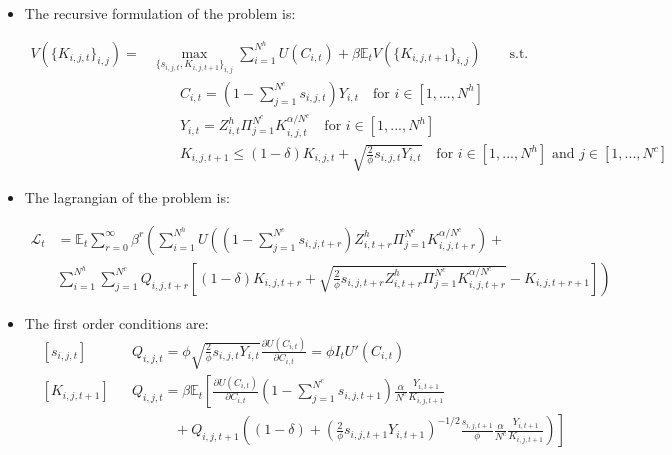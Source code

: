 \documentclass[11pt,english]{article}
\newcommand{\E}{\mathbb{E}}
\begin{document}
\begin{itemize}
	
	\item The recursive formulation of the problem is:
	
	
	\begin{align*}
	V\left(\{K_{i,j,t}\}_{i,j}\right) = &\max_{\{s_{i,j,t},K_{i,j,t+1}\}_{i,j}} \sum_{i=1}^{N^h} U(C_{i,t}) + \beta \E_t V(\{K_{i,j,t+1}\}_{i,j}) \qquad \text{s.t.}\\
	&\qquad
	C_{i,t} = (1-\sum_{j=1}^{N^c} s_{i,j,t})Y_{i,t} \quad \text{for } i \in [1,...,N^h]\\
	&\qquad
	Y_{i,t}=Z^h_{i,t} \Pi_{j=1}^{N^c} K_{i,j,t}^{\alpha/N^c}  \quad \text{for } i \in [1,...,N^h]\\
	&\qquad
	K_{i,j,t+1} \leq (1-\delta) K_{i,j,t} + \sqrt{\frac{2}{\phi} s_{i,j,t} Y_{i,t}}  \quad \text{for } i \in [1,...,N^h] \text{ and } j \in [1,...,N^c]
	\end{align*}
	
	
	\item The lagrangian of the problem is: 
	
	\begin{align*}
	\mathcal{L}_{t} &= \E_t \sum_{r=0}^{\infty}\beta^r  \left( \sum_{i=1}^{N^h} U\left( (1-\sum_{j=1}^{N^c} s_{i,j,t+r})Z^h_{i,t+r} \Pi_{j=1}^{N^c} K_{i,j,t+r}^{\alpha/N^c}  \right) + \right. \\
	& 	\left. \sum_{i=1}^{N^h} \sum_{j=1}^{N^c}  Q_{i,j,t+r} \left[(1-\delta) K_{i,j,t+r} + \sqrt{\frac{2}{\phi} s_{i,j,t+r} Z^h_{i,t+r} \Pi_{j=1}^{N^c} K_{i,j,t+r}^{\alpha/N^c}}-K_{i,j,t+r+1}\right] \right)
	\end{align*}
	
	\item The first order conditions are:
	\begin{align*}
	& \left[s_{i,j,t}\right] && Q_{i,j,t} =  \phi \sqrt{\frac{2}{\phi} s_{i,j,t} Y_{i,t}} \frac{\partial U(C_{i,t})}{\partial C_{i,t}} =\phi I_t U'(C_{i,t}) \\
	& \left[K_{i,j,t+1}\right] && Q_{i,j,t} = \beta \E_t \left[  \frac{\partial U(C_{i,t})}{\partial C_{i,t}}  (1-\sum_{j=1}^{N^c} s_{i,j,t+1}) \frac{\alpha}{N^c} \frac{Y_{i,t+1}}{K_{i,j,t+1}} \right. \\
	&   &&  \left. \quad  \qquad   +   Q_{i,j,t+1} \left( (1-\delta) + \left(\frac{2}{\phi} s_{i,j,t+1} Y_{i,t+1} \right)^{-1/2}  
	\frac{s_{i,j,t+1}}{\phi} \frac{\alpha}{N^c} \frac{Y_{i,t+1}}{K_{i,j,t+1}} \right)  \right]
	\end{align*}
	

\end{itemize}
\end{document}
